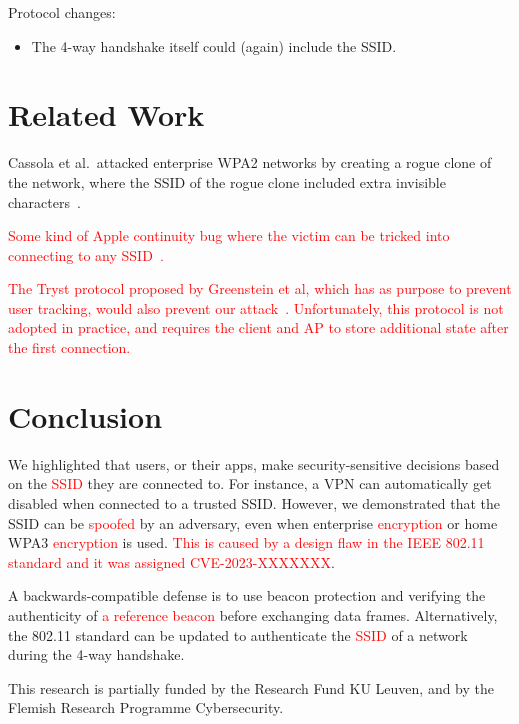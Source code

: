 \documentclass[sigconf,review,anonymous]{acmart}
\newcommand{\fourway}{\mbox{4-way}}
\DeclareRobustCommand{\red}[1]{\textcolor{red}{#1}}
\begin{document}
Protocol changes:
\begin{itemize}
	\item The 4-way handshake itself could (again) include the SSID.
\end{itemize}


\section{Related Work}
\label{sec:relatedwork}

Cassola et al.\ attacked enterprise WPA2 networks by creating a rogue clone of the network, where the SSID of the rogue clone included extra invisible characters~\cite{cassola2013practical}.

\red{Some kind of Apple continuity bug where the victim can be tricked into connecting to any SSID~\cite{stute2021disrupting}.}

\red{The Tryst protocol proposed by Greenstein et al, which has as purpose to prevent user tracking, would also prevent our attack~\cite{greenstein2008improving}.
Unfortunately, this protocol is not adopted in practice, and requires the client and AP to store additional state after the first connection.}

\section{Conclusion}
\label{sec:conclusion}

We highlighted that users, or their apps, make security-sensitive decisions based on the \red{SSID} they are connected to.
For instance, a VPN can automatically get disabled when connected to a trusted SSID. 
However, we demonstrated that the SSID can be \red{spoofed} by an adversary, even when enterprise \red{encryption} or home WPA3 \red{encryption} is used.
\red{This is caused by a design flaw in the IEEE 802.11 standard and it was assigned CVE-2023-XXXXXXX}.

A backwards-compatible defense is to use beacon protection and verifying the authenticity of \red{a reference beacon} before exchanging data frames.
Alternatively, the 802.11 standard can be updated to authenticate the \red{SSID} of a network during the \fourway{} handshake.

\begin{acks}
This research is partially funded by the Research Fund KU Leuven, and by the Flemish Research Programme Cybersecurity.
\end{acks}




\end{document}
